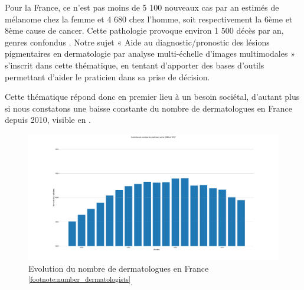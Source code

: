 Pour la France, ce n’est pas moins de 5 100 nouveaux cas par an estimés de mélanome chez la femme et 4 680 chez l’homme, soit respectivement la 6ème et 8ème cause de cancer. Cette pathologie provoque environ 1 500 décès par an, genres confondus \cite{Thuret2012}.
Notre sujet « Aide au diagnostic/pronostic des lésions pigmentaires en dermatologie par analyse multi-échelle d’images multimodales » s’inscrit dans cette thématique, en tentant d’apporter des bases d’outils permettant d’aider le praticien dans sa prise de décision.\par
Cette thématique répond donc en premier lieu à un besoin sociétal, d’autant plus si nous constatons une baisse constante du nombre de dermatologues en France depuis 2010, visible en .
\begin{figure}[H]
    \centering
    \includegraphics[width=\linewidth]{contents/i_introduction/resources/evolution_dermatologists.pdf}
    \caption{Evolution du nombre de dermatologues en France \textsuperscript{\ref{footnote:number_dermatologists}}.}
    \label{fig:number_dermatologists}
\end{figure}\par
\addtocounter{footnote}{1}

